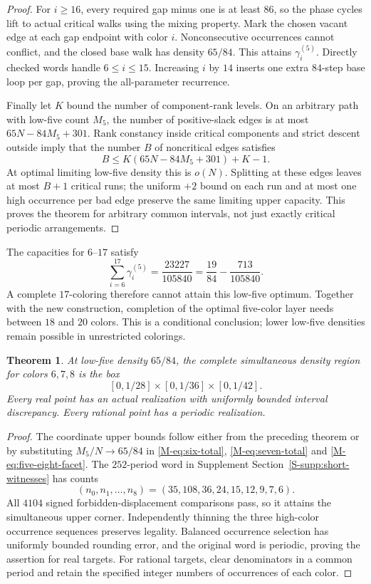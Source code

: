 \documentclass[11pt,reqno]{amsart}
\theoremstyle{plain}
\newtheorem{theorem}{Theorem}
\theoremstyle{plain}
\theoremstyle{plain}
\begin{document}
\begin{proof}
For $i\ge16$, every required gap minus one is at least $86$, so the
phase cycles lift to actual critical walks using the mixing property.
Mark the chosen vacant edge at each gap endpoint with color $i$.
Nonconsecutive occurrences cannot conflict, and the closed base walk
has density $65/84$. This attains $\gamma_i^{(5)}$. Directly checked
words handle $6\le i\le15$. Increasing $i$ by $14$ inserts one
extra $84$-step base loop per gap, proving the all-parameter recurrence.

Finally let $K$ bound the number of component-rank levels. On an
arbitrary path with low-five count $M_5$, the number of positive-slack
edges is at most $65N-84M_5+301$. Rank constancy inside critical
components and strict descent outside imply that the number $B$ of
noncritical edges satisfies
\[
 B\le K(65N-84M_5+301)+K-1.
\]
At optimal limiting low-five density this is $o(N)$. Splitting at these
edges leaves at most $B+1$ critical runs; the uniform $+2$ bound on each
run and at most one high occurrence per bad edge preserve the same
limiting upper capacity. This proves the theorem for arbitrary common
intervals, not just exactly critical periodic arrangements.
\end{proof}

The capacities for $6$--$17$ satisfy
\[
 \sum_{i=6}^{17}\gamma_i^{(5)}
 =\frac{23227}{105840}=\frac{19}{84}-\frac{713}{105840}.
\]
A complete $17$-coloring
therefore cannot attain this low-five optimum. Together with the new
construction, completion of the optimal five-color layer needs between
$18$ and $20$ colors. This is a conditional conclusion; lower
low-five densities remain possible in unrestricted colorings.

\begin{theorem}\label{M-thm:base-five-box}
At low-five density $65/84$, the complete simultaneous density region
for colors $6,7,8$ is the box
\[
 [0,1/28]\times[0,1/36]\times[0,1/42].
\]
Every real point has an actual realization with uniformly bounded
interval discrepancy. Every rational point has a periodic realization.
\end{theorem}

\begin{proof}
The coordinate upper bounds follow either from the preceding theorem
or by substituting $M_5/N\to65/84$ in
\eqref{M-eq:six-total}, \eqref{M-eq:seven-total} and
\eqref{M-eq:five-eight-facet}. The $252$-period word in Supplement
Section~\ref*{S-supp:short-witnesses} has counts
\[
 (n_0,n_1,\ldots,n_8)=(35,108,36,24,15,12,9,7,6).
\]
All $4104$ signed forbidden-displacement comparisons pass, so it
attains the simultaneous upper corner. Independently thinning the three
high-color occurrence sequences preserves legality. Balanced occurrence
selection has uniformly bounded rounding error, and the original word
is periodic, proving the assertion for real targets. For rational
targets, clear denominators in a common period and retain the specified
integer numbers of occurrences of each color.
\end{proof}
\end{document}
